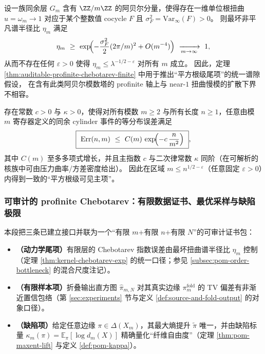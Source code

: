 \begin{corollary}\label{cor:abelian-tower-no-go}
设一族同余层 \(G_m\) 含有 \(\ZZ/m\ZZ\) 的阿贝尔分量，使得存在一维单位根扭曲 \(u=\omega_m\to 1\)
对应于某个整数值 cocycle \(F\) 且 \(\sigma_F^2=\mathrm{Var}_\infty(F)>0\)。
则最坏非平凡谱半径比 \(\eta_m\) 满足
\[
\eta_m\ \ge\ \exp\!\Bigl(-\frac{\sigma_F^2}{2}(2\pi/m)^2+O(m^{-4})\Bigr)\ \xrightarrow[m\to\infty]{}\ 1,
\]
从而不存在任何 \(\varepsilon>0\) 使得 \(\eta_m\le \lambda^{-1/2-\varepsilon}\) 对所有 \(m\) 成立。
因此，定理 \ref{thm:auditable-profinite-chebotarev-finite} 中用于推出“平方根级尾项”的统一谱隙假设，
在含有此类阿贝尔模数塔的 profinite 轴上与 near-\(1\) 扭曲慢模的扩散下界不相容。
\end{corollary}



\begin{conjecture}\label{conj:scaled-kernel-grh-diffusive}
存在常数 \(c>0\) 与 \(\kappa>0\)，使得对所有模数 \(m\ge 2\) 与所有长度 \(n\ge 1\)，任意由模 \(m\) 寄存器定义的同余 cylinder 事件的等分布误差满足
\[
\boxed{\ \mathrm{Err}(n,m)\ \le\ C(m)\,\exp\!\Bigl(-c\,\frac{n}{m^2}\Bigr)\ },
\]
其中 \(C(m)\) 至多多项式增长，并且主指数 \(c\) 与二次律常数 \(\kappa\) 同阶（在可解析的核族中可由压力曲率/方差密度给出）。
因此在区域 \(m\le n^{1/2-\varepsilon}\)（任意固定 \(\varepsilon>0\)）内得到一致的“平方根级可见主项”。
\end{conjecture}

\subsubsection{可审计的 profinite Chebotarev：有限数据证书、最优采样与缺陷极限}\label{subsec:auditable-profinite-chebotarev}

本段把三条已建立接口并联为一个“有限 \(m\)+有限 \(n\)+有限 \(N\)”的可审计证书包：
\begin{itemize}
  \item \textbf{（动力学尾项）}有限层的 Chebotarev 指数误差由最坏扭曲谱半径比 \(\eta_m\) 控制（定理 \ref{thm:kernel-chebotarev-exp} 的统一口径；参见 \ref{subsec:pom-order-bottleneck} 的混合尺度注记）。
  \item \textbf{（有限样本项）}折叠输出直方图 \(\hat{\pi}_{m,N}\) 对其真实边缘 \(\pi_m^{\mathrm{fold}}\) 的 TV 偏差有非渐近置信包络（第 \ref{sec:experiments} 节与定义 \ref{def:source-and-fold-output} 的对象口径）。
  \item \textbf{（缺陷项）}给定任意边缘 \(\pi\in\Delta(X_m)\)，其最大熵提升 \(\widetilde\pi\) 唯一，并由缺陷标量 \(\kappa_m(\pi)=\mathbb{E}_\pi[\log d_m(X)]\) 精确量化“纤维自由度”（定理 \ref{thm:pom-maxent-lift} 与定义 \ref{def:pom-kappa}）。
\end{itemize}

